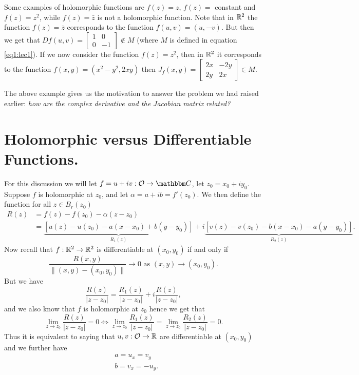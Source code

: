 \documentclass[../ComplexAnalysis_Notes.tex]{subfiles}
\begin{document}
\begin{Eg}{}{}
  Some examples of holomorphic functions are $f(z) = z$, $f(z) = $ constant and $f(z) = z^2$, while $f(z) = \bar{z}$ is not a holomorphic function. Note that in $\mathbb{R}^2$ the function $f(z) = \bar{z}$ corresponds to the function $f(u,v) = (u,-v)$. But then we get that $Df(u,v) = \begin{bmatrix}
      1 & 0 \\ 0 & -1
    \end{bmatrix} \notin M$ (where $M$ is defined in equation \ref{eq1:lec1}). If we now consider the function $f(z) = z^2$, then in $\mathbb{R}^2$ it corresponds to the function $f(x,y) = (x^2 - y^2, 2xy)$ then $J_f(x,y) = \begin{bmatrix}
      2x & -2y \\ 2y & 2x
    \end{bmatrix} \in M$.
\end{Eg}

The above example gives us the motivation to answer the problem we had raised earlier: \textit{how are the complex derivative and the Jacobian matrix related?}

\section{Holomorphic versus Differentiable Functions.}

For this discussion we will let $f = u + iv : \mO \to \C$, let $z_0 = x_0 + i y_0$. Suppose $f$ is holomorphic at $z_0$, and let $\alpha = a + i b = f'(z_0)$. We then define the function for all $z \in B_r(z_0)$
\begin{align*}
  R(z) & = f(z) - f(z_0) - \alpha (z-z_0)                                                                                                 \\
       & = \underbrace{[u(z) - u(z_0) - a(x-x_0) + b(y-y_0)]}_{R_1(z)} + i \underbrace{[v(z) - v(z_0) - b(x-x_0) - a(y - y_0)]}_{R_2(z)}.
\end{align*}
Now recall that $f : \mathbb{R}^2 \to \mathbb{R}^2$ is differentiable at $(x_0,y_0)$ if and only if
\[
  \frac{R(x,y)}{\| (x,y) - (x_0,y_0) \|} \to 0 \mbox{ as } (x,y) \to (x_0,y_0).
\]
But we have
\[
  \frac{R(z)}{|z-z_0|} = \frac{R_1(z)}{|z-z_0|} + i \frac{R(z)}{|z-z_0|},
\]
and we also know that $f$ is holomorphic at $z_0$ hence we get that
\[
  \lim_{z \to z_0} \frac{R(z)}{|z-z_0|} = 0 \Longleftrightarrow \lim_{z \to z_0} \frac{R_1(z)}{|z-z_0|} = \lim_{z \to z_0} \frac{R_2(z)}{|z-z_0|} = 0.
\]
Thus it is equivalent to saying that $u,v : \mathcal{O} \to \mathbb{R}$ are differentiable at $(x_0,y_0)$ and we further have
\begin{align*}
   & a = u_x = v_y    \\
   & b = v_x = - u_y.
\end{align*}
\end{document}
